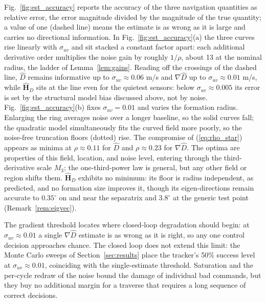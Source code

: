 \documentclass[lettersize,journal]{IEEEtran}
\begin{document}
Fig.~\ref{fig:est_accuracy} reports the accuracy of the three navigation
quantities as relative error, the error magnitude divided by the
magnitude of the true quantity; a value of one (dashed line) means the
estimate is as wrong as it is large and carries no directional
information. In Fig.~\ref{fig:est_accuracy}(a) the three curves rise
linearly with $\sigma_{uv}$ and sit stacked a constant factor apart: each
additional derivative order multiplies the noise gain by roughly
$1/\rho$, about 13 at the nominal radius, the ladder of
Lemma~\ref{lem:gains}. Reading off the crossings of the dashed line,
$\hat{D}$ remains informative up to $\sigma_{uv} \approx 0.06$ m/s and
$\nabla\hat{D}$ up to $\sigma_{uv} \approx 0.01$ m/s, while
$\hat{\mathbf{H}}_D$ sits at the line even for the quietest sensors:
below $\sigma_{uv} \approx 0.005$ its error is set by the structural
model bias discussed above, not by noise.
Fig.~\ref{fig:est_accuracy}(b) fixes $\sigma_{uv} = 0.01$ and varies the
formation radius. Enlarging the ring averages noise over a longer
baseline, so the solid curves fall; the quadratic model simultaneously
fits the curved field more poorly, so the noise-free truncation floors
(dotted) rise. The compromise of (\ref{eq:rho_star}) appears as minima
at $\rho \approx 0.11$ for $\hat{D}$ and $\rho \approx 0.23$ for
$\nabla\hat{D}$. The optima are properties of this field, location,
and noise level, entering through the third-derivative scale $M_3$;
the one-third-power law is general, but any other field or region
shifts them. $\hat{\mathbf{H}}_D$ exhibits no minimum: its floor is radius
independent, as predicted, and no formation size improves it, though its
eigen-directions remain accurate to $0.35^\circ$ on and near the
separatrix and $3.8^\circ$ at the generic test point
(Remark~\ref{rem:eigvec}).

The gradient threshold locates where closed-loop degradation should
begin: at $\sigma_{uv} \approx 0.01$ a single $\nabla\hat{D}$ estimate
is as wrong as it is right, so any one control decision approaches
chance. The closed loop does not extend this limit: the Monte Carlo
sweeps of Section~\ref{sec:results} place the tracker's 50\% success
level at $\sigma_{uv} \approx 0.01$, coinciding with the
single-estimate threshold. Saturation and the per-cycle redraw of the
noise bound the damage of individual bad commands, but they buy no
additional margin for a traverse that requires a long sequence of
correct decisions.


\end{document}
